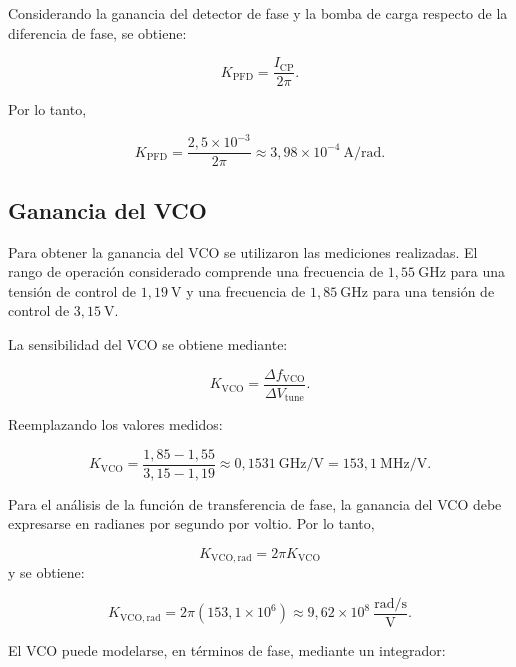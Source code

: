 Considerando la ganancia del detector de fase y la bomba de carga respecto de la diferencia de fase, se obtiene:

\begin{equation}
K_{\mathrm{PFD}} = \frac{I_{\mathrm{CP}}}{2\pi}.
\end{equation}

Por lo tanto,

\begin{equation}
K_{\mathrm{PFD}} = \frac{2{,}5\times10^{-3}}{2\pi} \approx 3{,}98\times10^{-4}~\mathrm{A/rad}.
\end{equation}

\subsection*{Ganancia del VCO}
Para obtener la ganancia del VCO se utilizaron las mediciones realizadas. El rango de operación considerado comprende una frecuencia de $1{,}55~\mathrm{GHz}$ para una tensión de control de $1{,}19~\mathrm{V}$ y una frecuencia de $1{,}85~\mathrm{GHz}$ para una tensión de control de $3{,}15~\mathrm{V}$.

La sensibilidad del VCO se obtiene mediante:

\begin{equation}
K_{\mathrm{VCO}} = \frac{\Delta f_{\mathrm{VCO}}}{\Delta V_{\mathrm{tune}}}.
\end{equation}

Reemplazando los valores medidos:

\begin{equation}
K_{\mathrm{VCO}} = \frac{1{,}85 - 1{,}55}{3{,}15 - 1{,}19} \approx 0{,}1531~\mathrm{GHz/V} = 153{,}1~\mathrm{MHz/V}.
\end{equation}

Para el análisis de la función de transferencia de fase, la ganancia del VCO debe expresarse en radianes por segundo por voltio. Por lo tanto,

\begin{equation}
K_{\mathrm{VCO,rad}} = 2\pi K_{\mathrm{VCO}}
\end{equation}
y se obtiene:

\begin{equation}
K_{\mathrm{VCO,rad}} = 2\pi(153{,}1\times10^6) \approx 9{,}62\times10^8~\frac{\mathrm{rad/s}}{\mathrm{V}}.
\end{equation}

El VCO puede modelarse, en términos de fase, mediante un integrador:

